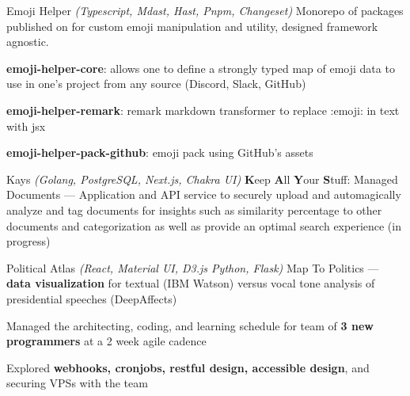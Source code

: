 

\begin{cventries}


\cventryproject
    {Emoji Helper} %
    {\emph{(Typescript, Mdast, Hast, Pnpm, Changeset)}}
    {} %
    {Monorepo of packages published on  for custom emoji manipulation and utility, designed framework agnostic.} %
    {
      \begin{cvitems} %
        \item {\textbf{emoji-helper-core}: allows one to define a strongly typed map of emoji data to use in one's project from any source (Discord, Slack, GitHub)}
        \item {\textbf{emoji-helper-remark}: remark markdown transformer to replace :emoji: in text with jsx}
        \item {\textbf{emoji-helper-pack-github}: emoji pack using GitHub's assets}
      \end{cvitems}
    }

\cventryproject
    {Kays} %
    {\emph{(Golang, PostgreSQL, Next.js, Chakra UI)}}
    {} %
    {\textbf{K}eep \textbf{A}ll \textbf{Y}our \textbf{S}tuff: Managed Documents --- Application and API service to securely upload and automagically analyze and tag documents for insights such as similarity percentage to other documents and categorization as well as provide an optimal search experience (in progress)} %
    {}

\cventryproject
    {Political Atlas} %
    {\emph{(React, Material UI, D3.js Python, Flask)}}
    {} %
    {Map To Politics --- \textbf{data visualization} for textual (IBM Watson) versus vocal tone analysis of presidential speeches (DeepAffects)} %
    {
      \begin{cvitems} %
        \item {Managed the architecting, coding, and learning schedule for team of \textbf{3 new programmers} at a 2 week agile cadence}
        \item {Explored \textbf{webhooks, cronjobs, restful design, accessible design}, and securing VPSs with the team}
      \end{cvitems}
    }


\end{cventries}
